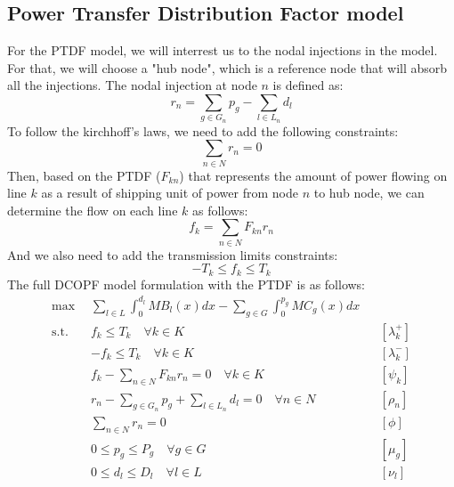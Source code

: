 \documentclass[12pt, openany]{report}
\theoremstyle{definition}
\begin{document}
\subsection{Power Transfer Distribution Factor model}
For the PTDF model, we will interrest us to the nodal injections in the model. For that, we will choose a "hub node", which is a reference node that will absorb all the injections. The nodal injection at node $n$ is defined as:
\begin{equation}
    r_n = \sum_{g \in G_n} p_g - \sum_{l \in L_n} d_l
\end{equation}
To follow the kirchhoff's laws, we need to add the following constraints:
\begin{equation}
    \sum_{n \in N} r_n = 0
\end{equation}
Then, based on the PTDF ($F_{kn}$) that represents the amount of power flowing on line $k$ as a result of shipping unit of power from node $n$ to hub node, we can determine the flow on each line $k$ as follows:
\begin{equation}
    f_k = \sum_{n \in N} F_{kn} r_n
\end{equation}
And we also need to add the transmission limits constraints:
\begin{equation}
    -T_k \leq f_k \leq T_k
\end{equation}
The full DCOPF model formulation with the PTDF is as follows:
\begin{equation}
    \begin{aligned}
        \max & \sum_{l \in L}  \int_{0}^{d_l} MB_l(x)dx - \sum_{g \in G} \int_{0}^{p_g} MC_g(x)dx &&\\
        \text{s.t.} \quad & f_k \leq T_k \quad \forall k \in K  && [\lambda_k^+] \\
        & -f_k \leq T_k \quad \forall k \in K  && [\lambda_k^-] \\
        & f_k - \sum_{n \in N} F_{kn} r_n = 0 \quad \forall k \in K  && [\psi_k] \\
        & r_n - \sum_{g \in G_n} p_g + \sum_{l \in L_n} d_l = 0 \quad \forall n \in N  && [\rho_n] \\
        & \sum_{n \in N} r_n = 0 && [\phi] \\
        & 0 \leq p_g \leq P_g \quad \forall g \in G  && [\mu_g] \\
        & 0 \leq d_l \leq D_l \quad \forall l \in L  && [\nu_l] \\
    \end{aligned}
\end{equation}
\end{document}
